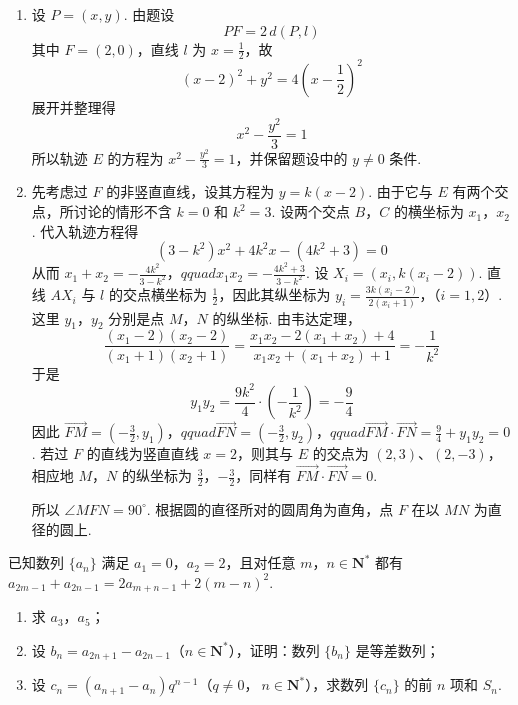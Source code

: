 \begin{solution}
\begin{enumerate}
\item 设 \(P=(x,y)\). 由题设
\[
PF=2\,d(P,l)
\]
其中 \(F=(2,0)\)，直线 \(l\) 为 \(x=\frac12\)，故
\[
(x-2)^2+y^2=4\left(x-\frac12\right)^2
\]
展开并整理得
\[
x^2-\frac{y^2}{3}=1
\]
所以轨迹 \(E\) 的方程为 \(x^2-\frac{y^2}{3}=1\)，并保留题设中的 \(y\ne0\) 条件.

\item 先考虑过 \(F\) 的非竖直直线，设其方程为 \(y=k(x-2)\). 由于它与 \(E\) 有两个交点，所讨论的情形不含 \(k=0\) 和 \(k^2=3\). 设两个交点 \(B\)，\(C\) 的横坐标为 \(x_1\)，\(x_2\). 代入轨迹方程得
\[
(3-k^2)x^2+4k^2x-(4k^2+3)=0
\]
从而
\(x_1+x_2=-\frac{4k^2}{3-k^2}\)，\(qquad x_1x_2=-\frac{4k^2+3}{3-k^2}\).
设 \(X_i=(x_i,k(x_i-2))\). 直线 \(AX_i\) 与 \(l\) 的交点横坐标为 \(\frac12\)，因此其纵坐标为
\(y_i=\frac{3k(x_i-2)}{2(x_i+1)}\)，（\(i=1,2\)）.
这里 \(y_1\)，\(y_2\) 分别是点 \(M\)，\(N\) 的纵坐标. 由韦达定理，
\[
\frac{(x_1-2)(x_2-2)}{(x_1+1)(x_2+1)}
=\frac{x_1x_2-2(x_1+x_2)+4}{x_1x_2+(x_1+x_2)+1}
=-\frac1{k^2}
\]
于是
\[
y_1y_2=\frac{9k^2}{4}\cdot\left(-\frac1{k^2}\right)=-\frac94
\]
因此
\(\overrightarrow{FM}=\left(-\frac32,y_1\right)\)，\(qquad \overrightarrow{FN}=\left(-\frac32,y_2\right)\)，\(qquad \overrightarrow{FM}\cdot\overrightarrow{FN}=\frac94+y_1y_2=0\).
若过 \(F\) 的直线为竖直直线 \(x=2\)，则其与 \(E\) 的交点为 \((2,3)\)、\((2,-3)\)，相应地 \(M\)，\(N\) 的纵坐标为 \(\frac32\)，\(-\frac32\)，同样有 \(\overrightarrow{FM}\cdot\overrightarrow{FN}=0\).

所以 \(\angle MFN=90^{\circ}\). 根据圆的直径所对的圆周角为直角，点 \(F\) 在以 \(MN\) 为直径的圆上.
\end{enumerate}
\end{solution}

\begin{problem}
已知数列 \(\{a_{n}\}\) 满足 \(a_1 = 0\)，\(a_2 = 2\)，且对任意 \(m\)，\(n \in \mathbf{N}^*\) 都有 \(a_{2m-1} + a_{2n-1} = 2a_{m+n-1} + 2(m - n)^2\).
\begin{enumerate}
\item 求 \(a_{3}\)，\(a_{5}\)；
\item 设 \( b_{n} = a_{2n + 1} - a_{2n - 1}\)（\(n \in \mathbf{N}^{*}\)），证明：数列 \(\{b_{n}\}\) 是等差数列；
\item 设 \(c_{n} = (a_{n + 1} - a_{n})q^{n - 1}\)（\(q\ne 0\)，\(\ n\in \mathbf{N}^{*}\)），求数列 \(\{c_n\}\) 的前 \(n\) 项和 \(S_{n}\).
\end{enumerate}
\end{problem}

